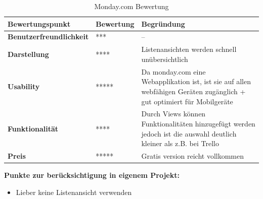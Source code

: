 \begin{table}[H]
    \centering
    \settowidth{}
    \setlength\extrarowheight{2pt}
    \begin{tabulary}{1.0\textwidth}{|L|L|L|}
      \hline
      \textbf{Bewertungspunkt} &
      \textbf{Bewertung} &
      \textbf{Begründung} \\
      \hline
      \textbf{Benutzerfreundlichkeit} &
      ***&
      --\\
      \hline
      \textbf{Darstellung} &
      ****&
     Listenansichten werden schnell unübersichtlich\\
      \hline
      \textbf{Usability} &
      *****&
      Da monday.com eine Webapplikation ist, ist sie auf allen webfähigen Geräten zugänglich + gut optimiert für Mobilgeräte\\
      \hline
      \textbf{Funktionalität} &
      ****&
      Durch Views können Funktionalitäten hinzugefügt werden jedoch ist die auswahl deutlich kleiner als z.B. bei Trello\\
      \hline
      \textbf{Preis} &
      *****&
      Gratis version reicht vollkommen\\
      \hline
    \end{tabulary}
    \caption{Monday.com Bewertung}
  \end{table}
\space
\textbf{Punkte zur berücksichtigung in eigenem Projekt:}
\begin{itemize}
    \item Lieber keine Listenansicht verwenden
\end{itemize}

  
  